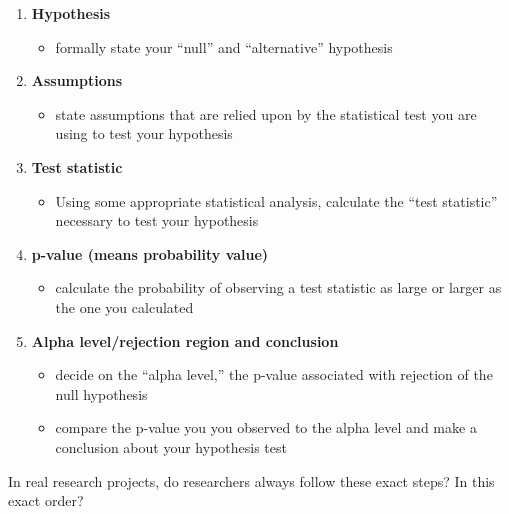 \documentclass[
  letterpaper,
  DIV=11,
  numbers=noendperiod]{scrartcl}
\providecommand{\tightlist}{%
  \setlength{\itemsep}{0pt}\setlength{\parskip}{0pt}}\usepackage{longtable,booktabs,array}
\begin{document}
\begin{enumerate}
\def\labelenumi{\arabic{enumi}.}
\tightlist
\item
  \textbf{Hypothesis}

  \begin{itemize}
  \tightlist
  \item
    formally state your ``null'' and ``alternative'' hypothesis
  \end{itemize}
\item
  \textbf{Assumptions}

  \begin{itemize}
  \tightlist
  \item
    state assumptions that are relied upon by the statistical test you
    are using to test your hypothesis
  \end{itemize}
\item
  \textbf{Test statistic}

  \begin{itemize}
  \tightlist
  \item
    Using some appropriate statistical analysis, calculate the ``test
    statistic'' necessary to test your hypothesis
  \end{itemize}
\item
  \textbf{p-value (means probability value)}

  \begin{itemize}
  \tightlist
  \item
    calculate the probability of observing a test statistic as large or
    larger as the one you calculated
  \end{itemize}
\item
  \textbf{Alpha level/rejection region and conclusion}

  \begin{itemize}
  \tightlist
  \item
    decide on the ``alpha level,'' the p-value associated with rejection
    of the null hypothesis
  \item
    compare the p-value you you observed to the alpha level and make a
    conclusion about your hypothesis test
  \end{itemize}
\end{enumerate}

In real research projects, do researchers always follow these exact
steps? In this exact order?
\end{document}
